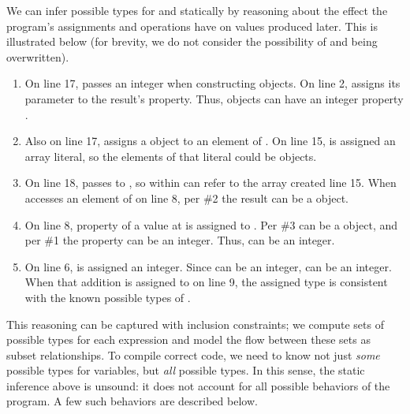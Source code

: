 We can infer possible types for  and  statically
by reasoning about the effect the program's assignments
and operations have on values produced later.
This is illustrated below (for brevity, we do not consider
the possibility of  and  being overwritten).

\begin{enumerate}
\item On line 17,  passes an integer when constructing 
      objects. On line 2,  assigns its parameter to the result's
       property. Thus,  objects can have an
      integer property .
\item Also on line 17,  assigns a  object to an element
      of . On line 15,  is assigned an array literal,
      so the elements of that literal could be  objects.
\item On line 18,  passes  to , so 
      within  can refer to the array created line 15.
      When  accesses an element of  on line 8,
      per \#2 the result can be a  object.
\item On line 8, property  of a value at  is assigned to .
      Per \#3  can be a  object, and per \#1 the
       property can be an integer. Thus,  can be an integer.
\item On line 6,  is assigned an integer. Since  can be
      an integer,  can be an integer.
      When that addition is assigned to  on line 9, the assigned
      type is consistent with the known possible types of .
\end{enumerate}

This reasoning can be captured with inclusion constraints; we compute
sets of possible types for each expression and model the flow between
these sets as subset relationships.
To compile correct code, we need to know not just \emph{some}
possible types for variables, but \emph{all} possible types.
In this sense, the static inference above is unsound: it does not account
for all possible behaviors of the program.
A few such behaviors are described below.

